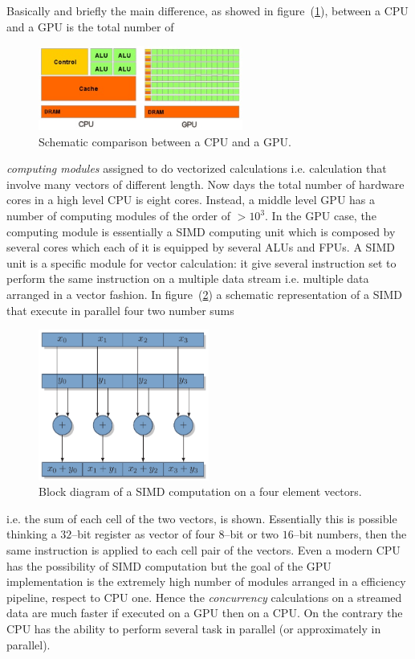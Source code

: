 Basically and briefly the main difference, as showed in figure~(\ref{fig:GPUvsCPU}), between a CPU and a GPU is the total number of 
\begin{figure}[h!t]
	\centering
	\includegraphics[width=0.6\textwidth]{./img/GPUvsCPU}
	\caption{Schematic comparison between a CPU and a GPU.}
	\label{fig:GPUvsCPU}
\end{figure}
\textit{computing modules} assigned to do vectorized calculations i.e. calculation that involve many vectors of different length. Now days the total number of hardware cores in a high level CPU is eight cores. Instead, a middle level GPU has a number of computing modules of the order of $ > 10^3$. In the GPU case, the computing module is essentially a \ac{SIMD} computing unit which is composed by several cores which each of it is equipped by several ALUs and FPUs. A \ac{SIMD} unit is a specific module for vector calculation: it give several instruction set to perform the same instruction on a multiple data stream i.e. multiple data arranged in a vector fashion. In figure~(\ref{fig:simd}) a schematic representation of a \ac{SIMD} that execute in parallel four two number sums
\begin{figure}[h!t]
	\centering
	\includegraphics[width=0.5\textwidth]{./img/simd}
	\caption{Block diagram of a \acs{SIMD} computation on a four element vectors.}
	\label{fig:simd}
\end{figure}
i.e. the sum of each cell of the two vectors, is shown. Essentially this is possible thinking a $32$--bit register as vector of four $8$--bit or two $16$--bit numbers, then the same instruction is applied to each cell pair of the vectors. Even a modern CPU has the possibility of \ac{SIMD} computation but the goal of the GPU implementation is the extremely high number of modules arranged in a efficiency pipeline, respect to CPU one. Hence the \textit{concurrency} calculations on a streamed data are much faster if executed on a GPU then on a CPU. On the contrary the CPU has the ability to perform several task in parallel (or approximately in parallel).
